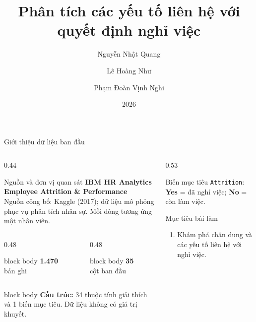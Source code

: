 \documentclass[10pt,aspectratio=169]{beamer}
\title{Phân tích các yếu tố liên hệ với quyết định nghỉ việc}
\author{Nguyễn Nhật Quang \and Lê Hoàng Như \and Phạm Đoàn Vịnh Nghi}
\date{2026}
\newcommand{\metric}[3]{%
  \begin{beamercolorbox}[wd=\linewidth,sep=0.12cm,center,rounded=true]{block body}
    {\color{#3}\bfseries\Large #1}\\[-0.03cm]
    {\color{MutedText}\scriptsize #2}
  \end{beamercolorbox}
}
\begin{document}
\begin{frame}[plain]
  \titlepage
\end{frame}


\begin{frame}{Giới thiệu dữ liệu ban đầu}
  \begin{columns}[T,onlytextwidth]
    \begin{column}{0.44\textwidth}
      \begin{block}{Nguồn và đơn vị quan sát}
        \small
        \textbf{IBM HR Analytics Employee Attrition \& Performance}\\
        Nguồn công bố: Kaggle (2017); dữ liệu mô phỏng phục vụ phân tích
        nhân sự. Mỗi dòng tương ứng một nhân viên.
      \end{block}
      \vspace{0.12cm}
      \begin{columns}[onlytextwidth]
        \begin{column}{0.48\textwidth}
          \metric{1.470}{bản ghi}{HCMUSBlue}
        \end{column}
        \begin{column}{0.48\textwidth}
          \metric{35}{cột ban đầu}{HCMUSTeal}
        \end{column}
      \end{columns}
      \vspace{0.12cm}
      \begin{beamercolorbox}[sep=0.14cm,rounded=true]{block body}
        \small
        \textbf{Cấu trúc:} 34 thuộc tính giải thích và 1 biến mục tiêu.
        Dữ liệu không có giá trị khuyết.
      \end{beamercolorbox}
    \end{column}
    \begin{column}{0.53\textwidth}
      \begin{block}{Biến mục tiêu}
        \centering\small
        \texttt{Attrition}: \textbf{Yes} = đã nghỉ việc;\quad
        \textbf{No} = còn làm việc.
      \end{block}
      \vspace{0.10cm}
      \begin{block}{Mục tiêu bài làm}
        \small
        \begin{enumerate}
          \item Khám phá chân dung và các yếu tố liên hệ với nghỉ việc.

\end{enumerate}
\end{block}
\end{column}
\end{columns}
\end{frame}
\end{document}
